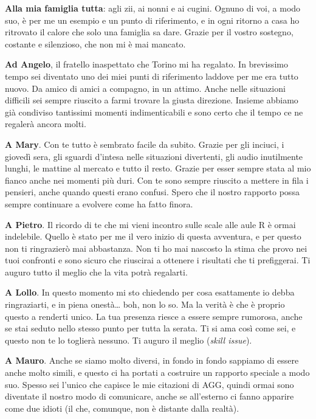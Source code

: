 {\textbf{Alla mia famiglia tutta}: agli zii, ai nonni e ai cugini. Ognuno di voi, a modo suo, è per me un esempio e un punto di riferimento, e in ogni ritorno a casa ho ritrovato il calore che solo una famiglia sa dare. Grazie per il vostro sostegno, costante e silenzioso, che non mi è mai mancato.

\textbf{Ad Angelo}, il fratello inaspettato che Torino mi ha regalato. In brevissimo tempo sei diventato uno dei miei punti di riferimento laddove per me era tutto nuovo. Da amico di amici a compagno, in un attimo. Anche nelle situazioni difficili sei sempre riuscito a farmi trovare la giusta direzione. Insieme abbiamo già condiviso tantissimi momenti indimenticabili e sono certo che il tempo ce ne regalerà ancora molti.

\textbf{A Mary}. Con te tutto è sembrato facile da subito. Grazie per gli inciuci, i giovedì sera, gli sguardi d'intesa nelle situazioni divertenti, gli audio inutilmente lunghi, le mattine al mercato e tutto il resto. Grazie per esser sempre stata al mio fianco anche nei momenti più duri. Con te sono sempre riuscito a mettere in fila i pensieri, anche quando questi erano confusi. Spero che il nostro rapporto possa sempre continuare a evolvere come ha fatto finora.

\textbf{A Pietro}. Il ricordo di te che mi vieni incontro sulle scale alle aule R è ormai indelebile. Quello è stato per me il vero inizio di questa avventura, e per questo non ti ringrazierò mai abbastanza. Non ti ho mai nascosto la stima che provo nei tuoi confronti e sono sicuro che riuscirai a ottenere i risultati che ti prefiggerai. Ti auguro tutto il meglio che la vita potrà regalarti.

\textbf{A Lollo}. In questo momento mi sto chiedendo per cosa esattamente io debba ringraziarti, e in piena onestà\dots{} boh, non lo so. Ma la verità è che è proprio questo a renderti unico. La tua presenza riesce a essere sempre rumorosa, anche se stai seduto nello stesso punto per tutta la serata. Ti si ama così come sei, e questo non te lo toglierà nessuno. Ti auguro il meglio (\emph{skill issue}).

\textbf{A Mauro}. Anche se siamo molto diversi, in fondo in fondo sappiamo di essere anche molto simili, e questo ci ha portati a costruire un rapporto speciale a modo suo. Spesso sei l'unico che capisce le mie citazioni di AGG, quindi ormai sono diventate il nostro modo di comunicare, anche se all'esterno ci fanno apparire come due idioti (il che, comunque, non è distante dalla realtà).

}
